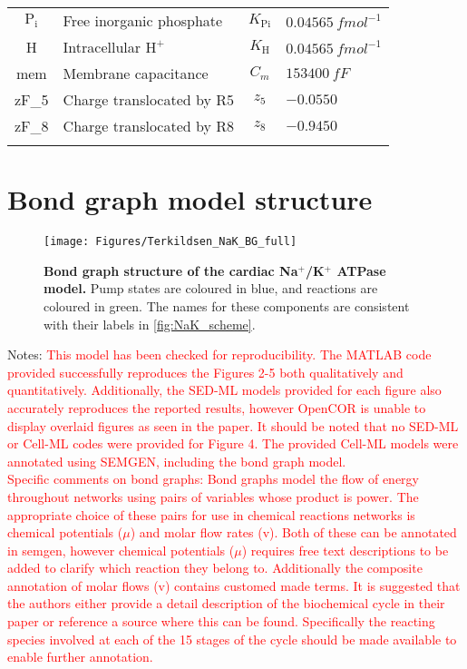 \documentclass[11pt]{article}
\begin{document}
\begin{table}[H]
\begin{tabular}{cl c l}
		$\text{P}_\text{i}$ & Free inorganic phosphate & $K_\text{Pi}$ & $0.04565\ \si{fmol^{-1}}$ \\ 
		H & Intracellular $\text{H}^+$ & $K_\text{H}$ & $0.04565\ \si{fmol^{-1}}$ \\ 
		mem & Membrane capacitance & $C_m$ & $153400\ \si{fF}$ \\
		zF{\_}5 & Charge translocated by R5 & $z_5$ & $-0.0550$ \\
		zF{\_}8 & Charge translocated by R8 & $z_8$ & $-0.9450$ \\ \bottomrule& & 
	\end{tabular}
	\label{tab:bg_parameters}
\end{table}

\newpage
\section{Bond graph model structure}
\label{sec:BG_structure}
\begin{figure}[H]
	\centering
	\texttt{[image: Figures/Terkildsen\_NaK\_BG\_full]}
	\caption{\textbf{Bond graph structure of the cardiac Na$^+$/K$^+$ ATPase model.} Pump states are coloured in blue, and reactions are coloured in green. The names for these components are consistent with their labels in \autoref{fig:NaK_scheme}.}
	\label{fig:Terkildsen_NaK}
\end{figure}

Notes: \textcolor{red}{This model has been checked for reproducibility. The MATLAB code provided successfully reproduces the Figures 2-5 both qualitatively and quantitatively. Additionally, the SED-ML models provided for each figure also accurately reproduces the reported results, however OpenCOR is unable to display overlaid figures as seen in the paper. It should be noted that no SED-ML or Cell-ML codes were provided for Figure 4. 
The provided Cell-ML models were annotated using SEMGEN, including the bond graph model.\\
Specific comments on bond graphs: Bond graphs model the flow of energy throughout networks using pairs of variables whose product is power. The appropriate choice of these pairs for use in chemical reactions networks is chemical potentials ($\mu$) and molar flow rates (v). Both of these can be annotated in semgen, however chemical potentials ($\mu$) requires free text descriptions to be added to clarify which reaction they belong to. Additionally the composite annotation of molar flows (v) contains customed made terms. It is suggested that the authors either provide a detail description of the biochemical cycle in their paper or reference a source where this can be found. Specifically the reacting species involved at each of the 15 stages of the cycle should be made available to enable further annotation.}
\end{document}
